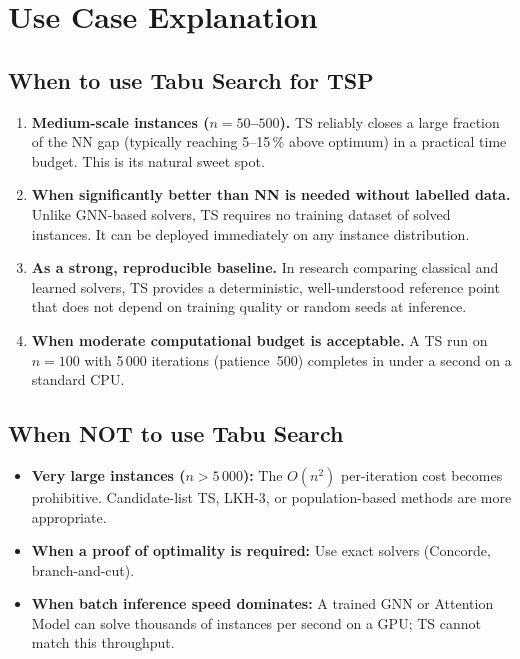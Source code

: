 \documentclass[12pt,a4paper]{article}
\begin{document}
\section{Use Case Explanation}

\subsection*{When to use Tabu Search for TSP}

\begin{enumerate}[leftmargin=2em]
  \item \textbf{Medium-scale instances ($n = 50$--$500$).}
    TS reliably closes a large fraction of the NN gap (typically reaching
    5--15\,\% above optimum) in a practical time budget.
    This is its natural sweet spot.

  \item \textbf{When significantly better than NN is needed without labelled
    data.}
    Unlike GNN-based solvers, TS requires no training dataset of solved
    instances.
    It can be deployed immediately on any instance distribution.

  \item \textbf{As a strong, reproducible baseline.}
    In research comparing classical and learned solvers, TS provides a
    deterministic, well-understood reference point that does not depend on
    training quality or random seeds at inference.

  \item \textbf{When moderate computational budget is acceptable.}
    A TS run on $n = 100$ with 5\,000 iterations (patience~500) completes
    in under a second on a standard CPU.
\end{enumerate}

\subsection*{When NOT to use Tabu Search}

\begin{itemize}[leftmargin=1.5em]
  \item \textbf{Very large instances ($n > 5\,000$):} The $O(n^2)$ per-iteration
    cost becomes prohibitive.
    Candidate-list TS, LKH-3, or population-based methods are more appropriate.
  \item \textbf{When a proof of optimality is required:} Use exact solvers
    (Concorde, branch-and-cut).
  \item \textbf{When batch inference speed dominates:} A trained GNN or
    Attention Model can solve thousands of instances per second on a GPU;
    TS cannot match this throughput.
\end{itemize}
\end{document}
